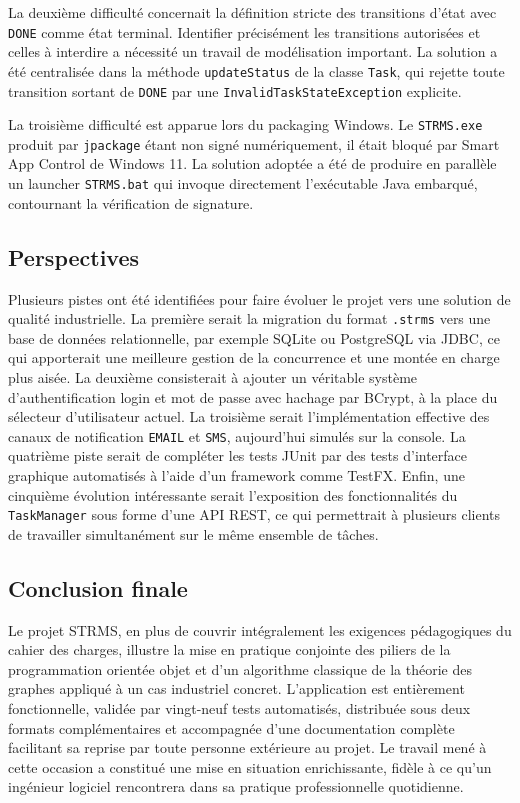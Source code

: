 \documentclass[11pt]{article}
\begin{document}
La deuxième difficulté concernait la définition stricte des transitions
d'état avec \texttt{DONE} comme état terminal. Identifier précisément
les transitions autorisées et celles à interdire a nécessité un travail
de modélisation important. La solution a été centralisée dans la
méthode \texttt{updateStatus} de la classe \texttt{Task}, qui rejette
toute transition sortant de \texttt{DONE} par une
\texttt{InvalidTaskStateException} explicite.

La troisième difficulté est apparue lors du packaging Windows. Le
\texttt{STRMS.exe} produit par \texttt{jpackage} étant non signé
numériquement, il était bloqué par Smart App Control de Windows 11. La
solution adoptée a été de produire en parallèle un launcher
\texttt{STRMS.bat} qui invoque directement l'exécutable Java embarqué,
contournant la vérification de signature.

\subsection{Perspectives}
Plusieurs pistes ont été identifiées pour faire évoluer le projet vers
une solution de qualité industrielle. La première serait la migration
du format \texttt{.strms} vers une base de données relationnelle, par
exemple SQLite ou PostgreSQL via JDBC, ce qui apporterait une meilleure
gestion de la concurrence et une montée en charge plus aisée. La
deuxième consisterait à ajouter un véritable système d'authentification
login et mot de passe avec hachage par BCrypt, à la place du sélecteur
d'utilisateur actuel. La troisième serait l'implémentation effective des
canaux de notification \texttt{EMAIL} et \texttt{SMS}, aujourd'hui
simulés sur la console. La quatrième piste serait de compléter les
tests JUnit par des tests d'interface graphique automatisés à l'aide
d'un framework comme TestFX. Enfin, une cinquième évolution intéressante
serait l'exposition des fonctionnalités du \texttt{TaskManager} sous
forme d'une API REST, ce qui permettrait à plusieurs clients de
travailler simultanément sur le même ensemble de tâches.

\subsection{Conclusion finale}
Le projet STRMS, en plus de couvrir intégralement les exigences
pédagogiques du cahier des charges, illustre la mise en pratique
conjointe des piliers de la programmation orientée objet et d'un
algorithme classique de la théorie des graphes appliqué à un cas
industriel concret. L'application est entièrement fonctionnelle, validée
par vingt-neuf tests automatisés, distribuée sous deux formats
complémentaires et accompagnée d'une documentation complète facilitant
sa reprise par toute personne extérieure au projet. Le travail mené à
cette occasion a constitué une mise en situation enrichissante,
fidèle à ce qu'un ingénieur logiciel rencontrera dans sa pratique
professionnelle quotidienne.
\end{document}
